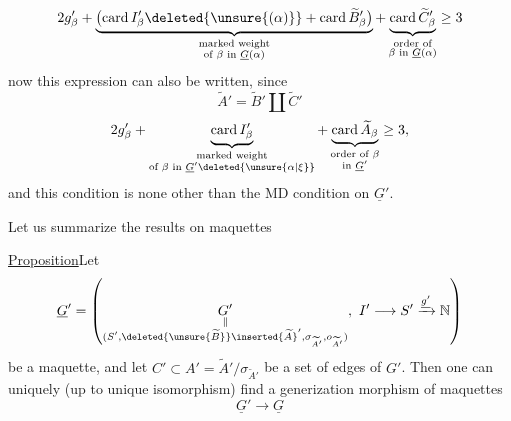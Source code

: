 \[
2g'_\beta+\underbrace{\bigl(\operatorname{card}I'_\beta\deleted{\unsure{(\alpha)}}+\operatorname{card}\widetilde B'_\beta\bigr)}_{\substack{\text{marked weight}\\\text{of }\beta\text{ in }\underline G(\alpha)}}+\underbrace{\operatorname{card}\widetilde C'_\beta}_{\substack{\text{order of}\\\beta\text{ in }\underline G(\alpha)}}\geq3
\]
now this expression can also be written, since
\[
\widetilde A'=\widetilde B'\amalg\widetilde C'
\]
\[
2g'_\beta+\underbrace{\operatorname{card}I'_\beta}_{\substack{\text{marked weight}\\\text{of }\beta\text{ in }\underline G'\deleted{\unsure{\alpha|\xi}}}}+\underbrace{\operatorname{card}\widetilde A_\beta}_{\substack{\text{order of }\beta\\\text{in }\underline G'}}\geq3,
\]
and this condition is none other than the MD  condition on $\underline G'$.

Let us summarize the results on maquettes

\uline{Proposition}\quad Let
\[
\underline G'=\left(\underset{\substack{\Vert\\(S',\deleted{\unsure{\widetilde B}}\inserted{\widetilde A}',\sigma_{\widetilde A'},o_{\widetilde A'})}}{G'},\ I'\longrightarrow S'\xrightarrow{\underline{g'}}\mathbb N\right)
\]
be a maquette, and let $C'\subset A'=\widetilde A'/\sigma_{\widetilde A'}$ be a set of edges of $G'$. Then one can uniquely  (up to unique isomorphism) find a generization morphism of maquettes
\[
\underline G'\longrightarrow\underline G
\]
